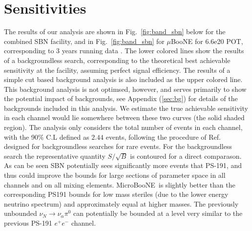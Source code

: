 \documentclass[11pt, a4paper]{article}
\newcommand{\reffig}[1]{Fig.~\ref{#1}}
\newcommand{\refref}[1]{Ref.~\cite{#1}}
\def\muboone{MicroBooNE}
\begin{document}
\section{Sensitivities\label{sec:sensitivity}}
%
The results of our analysis are shown in \reffig{fig:band_sbn} below for the
combined SBN facility, and in \reffig{fig:band_sbn} for $\mu$BooNE for 6.6e20
POT, corresponding to 3 years running data . The lower colored lines show the
results of a backgroundless search, corresponding to the theoretical best
achievable sensitivity at the facility, assuming perfect signal efficiency. The
results of a simple cut based background analysis is also included as the upper
colored line. This background analysis is not optimsed, however, and serves
primarily to show the potential impact of backgrounds, see Appendix
(\ref{sec:bg}) for details of the backgrounds included in this analysis. We
estimate the true achievable sensitivity in each channel would lie somewhere
between these two curves (the solid shaded region). The analysis only considers
the total number of events in each channel, with the 90\% C.L defined as $2.44$
events, following the procedure of \refref{Feldman:1997qc} designed for
backgroundless searches for rare events. For the backgroundless search the
representative quantity $S/\sqrt{B}$ is contoured for a direct comparason.  \\

As can be seen SBN potentially sees significantly more events that PS-191, and
thus could improve the bounds for large sections of parameter space in all
channels and on all mixing elements. \muboone\ is slightly better than the
corresponding PS191 bounds for low mass steriles (due to the lower energy
neutrino spectrum) and approximately equal at higher masses. The previously
unbounded $\nu_N \rightarrow \nu_\alpha \pi^0$ can potentially be bounded at a
level very similar to the previous PS-191 $e^+ e^-$ channel. 
\end{document}
